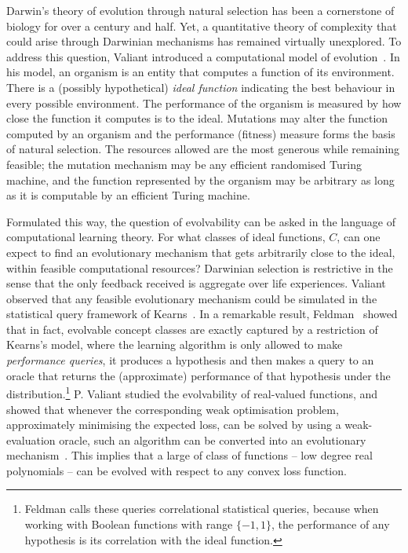 Darwin's theory of evolution through natural selection has been a cornerstone of
biology for over a century and half. Yet, a quantitative theory of complexity
that could arise through Darwinian mechanisms has remained virtually unexplored.
To address this question, Valiant introduced a computational model of
evolution~\cite{Valiant:2009-evolvability}.
In his model, an organism is an entity that computes a function of
its environment.  There is a (possibly hypothetical) \emph{ideal function}
indicating the best behaviour in every possible environment. The performance of
the organism is measured by how close the function it computes is to the ideal.
Mutations may alter the function computed by an organism and the performance
(fitness) measure forms the basis of natural selection. The resources allowed
are the most generous while remaining feasible; the mutation mechanism may be
any efficient randomised Turing machine, and the function represented by the
organism may be arbitrary as long as it is computable by an efficient Turing
machine.

Formulated this way, the question of evolvability can be asked in the language
of computational learning theory. For what classes of ideal functions, $C$, can
one expect to find an evolutionary mechanism that gets arbitrarily close to the
ideal, within feasible computational resources? Darwinian selection is
restrictive in the sense that the only feedback received is aggregate over life
experiences. Valiant observed that any feasible evolutionary mechanism could be
simulated in the statistical query framework of Kearns~\cite{Kearns:1998}. In a
remarkable result, Feldman~\cite{Feldman:2008-evolvability} showed that in fact,
evolvable concept classes are exactly captured by a restriction of Kearns's
model, where the learning algorithm is only allowed to make \emph{performance
queries}, \ie it produces a hypothesis and then makes a query to an oracle that
returns the (approximate) performance of that hypothesis under the
distribution.\footnote{Feldman calls these queries correlational statistical
queries, because when working with Boolean functions with range $\{-1, 1\}$, the
performance of any hypothesis is its correlation with the ideal function.} P.
Valiant studied the evolvability of real-valued functions, and showed that
whenever the corresponding weak optimisation problem, \ie approximately
minimising the expected loss, can be solved by using a weak-evaluation oracle,
such an algorithm can be converted into an evolutionary
mechanism~\cite{Valiant:2012-real}. This implies that a large of class of
functions -- low degree real polynomials -- can be evolved with respect to any
convex loss function.

